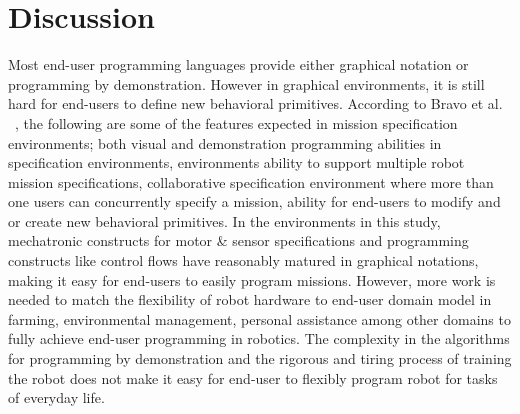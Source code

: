 \section{Discussion}





Most end-user programming languages provide either graphical notation or programming by demonstration. However in graphical environments, it is still hard for end-users to define new behavioral primitives.%
 According to Bravo et al. ~\cite{Bravo2018}, the following are some of the features expected in mission specification environments; both visual and demonstration programming abilities in specification environments, environments ability to support multiple robot mission specifications, collaborative specification environment where more than one users can concurrently specify a mission, ability for end-users to modify and or create new behavioral primitives. 
 In the environments in this study, mechatronic constructs for motor \& sensor specifications and programming constructs like control flows have reasonably matured in graphical notations, making it easy for end-users to easily program missions. However, more work is needed to match the flexibility of robot hardware to end-user domain model in farming, environmental management, personal assistance among other domains to fully achieve end-user programming in robotics. The complexity in the algorithms for programming by demonstration and the rigorous and tiring process of training the robot does not make it easy for end-user to flexibly program robot for tasks of everyday life.
